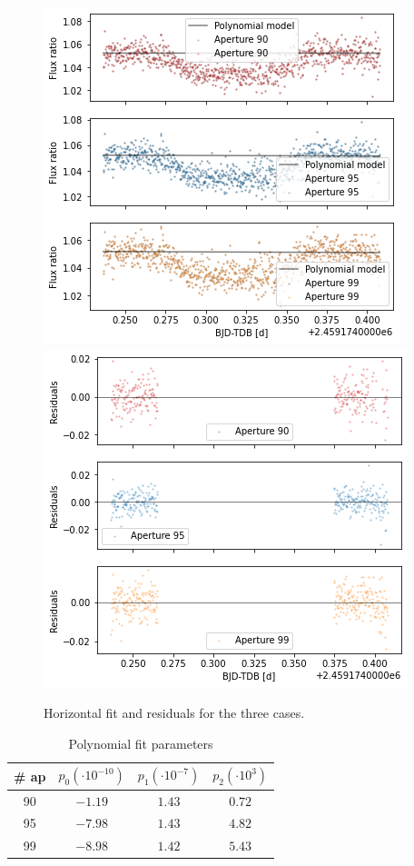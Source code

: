\documentclass[a4paper,11pt,twocolumn]{article}
\begin{document}
\begin{figure}
    \centering  
    \includegraphics[scale=0.45, angle=0]{../pictures/taste/fit.png}
    \includegraphics[scale=0.45, angle=0]{../pictures/taste/residuals.png}
    \caption{Horizontal fit and residuals for the three cases.}
    \label{fig:fit}
\end{figure}

\begin{table}[h!]
\centering
    \begin{tabular}{cccc}
    \hline
    \# ap & $p_0 (\cdot 10^{-10})$ & $p_1 (\cdot 10^{-7})$ & $p_2 ( \cdot 10^3)$ \\
    \hline
    90 & $-1.19$ & $1.43$  & $0.72$\\
    95 & $-7.98$ & $1.43$  &  $4.82$\\
    99 & $-8.98$ & $1.42$  & $5.43$\\
    \hline
    \end{tabular}
\caption{Polynomial fit parameters}
\label{table:d}
\end{table}
\end{document}

